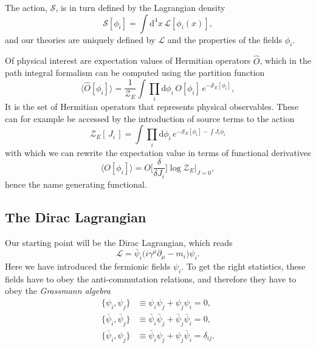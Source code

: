 The action, $\mathcal{S}$, is in turn defined by the Lagrangian density
%
\begin{equation} \label{eq:action-def}
  \mathcal{S}[\phi_i] = \int \mathrm{d}^4 x\, \mathcal{L}[\phi_i(x)],
\end{equation}
%
and our theories are uniquely defined by $\mathcal{L}$ and the
properties of the fields $\phi_i$.

Of physical interest are expectation values of Hermitian operators $\widehat{O}$,
which in the path integral formalism can be computed using the partition
function
%
\begin{equation} \label{eq:expectation_value}
  \big\langle \widehat{O}[\phi_i] \big\rangle = \frac{1}{\mathcal{Z}_E} 
    \int \prod_i \mathrm{d} \phi_i \, O[\phi_i]\, e^{-\mathcal{S}_E[\phi_i]},
\end{equation}
%
It is the set of Hermitian operators that represents physical observables.
These can for example be accessed by the introduction of source terms to the
action
%
\begin{equation}
  \mathcal{Z}_E [\,J_i\,] = \int \prod_i \mathrm{d} \phi_i \,
    e^{-\mathcal{S}_E[\phi_i] - \int J_i \phi_i}
\end{equation}
%
with which we can rewrite the expectation value in terms of functional
derivatives
%
\begin{equation}
  \big\langle O[\phi_i] \big\rangle = O\bigg[ \frac{\delta}{\delta J_i} \bigg]
    \log \mathcal{Z}_E \bigg|_{J=0},
\end{equation}
%
hence the name generating functional.

\subsection{The Dirac Lagrangian}

Our starting point will be the Dirac Lagrangian, which reads
%
\begin{equation}
  \mathcal{L} = \bar{\psi}_i \big(i\gamma^{\mu} \partial_{\mu} - m_i\big)
  \psi_i. \label{eq:ldirac}
\end{equation}
%
Here we have introduced the fermionic fields $\psi_i$. To get the right
statistics, these fields have to obey the anti-commutation relations, and
therefore they have to obey the \emph{Grassmann algebra}
%
\begin{align}
  \big\{ \psi_i, \psi_j \big\} &\equiv \psi_i \psi_j + \psi_j \psi_i = 0,\\
  \big\{ \bar{\psi}_i, \bar{\psi}_j \big\} &\equiv \bar{\psi}_i \bar{\psi}_j +
    \bar{\psi}_j \bar{\psi}_i = 0,\\
  \big\{ \bar{\psi}_i, \psi_j \big\} &\equiv \bar{\psi}_i \psi_j + \psi_j
    \bar{\psi}_i = \delta_{ij}.
\end{align}

